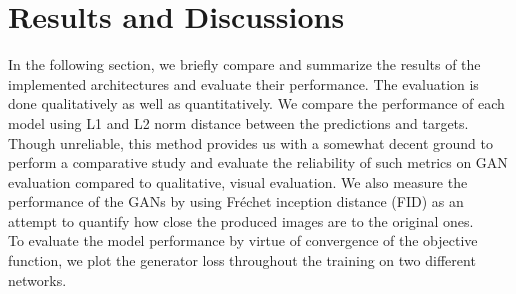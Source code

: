 \documentclass[conference]{IEEEtran}
\begin{document}
\section{Results and Discussions}
\hspace*{0.25 in}In the following section, we briefly compare and summarize the results of the implemented architectures and evaluate their performance. The evaluation is done qualitatively as well as quantitatively. We compare the performance of each model using L1 and L2 norm distance between the predictions and targets. Though unreliable, this method provides us with a somewhat decent ground to perform a comparative study and evaluate the reliability of such metrics on GAN evaluation compared to qualitative, visual evaluation. We also measure the performance of the GANs by using Fréchet inception distance (FID) as an attempt to quantify how close the produced images are to the original ones.\\
\hspace*{0.25 in}To evaluate the model performance by virtue of convergence of the objective function, we plot the generator loss throughout the training on two different networks.\\
\end{document}
